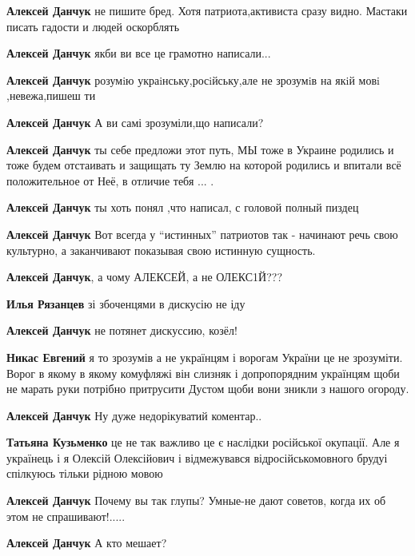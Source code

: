 \begin{itemize}
{\begin{itemize}
\textbf{Алексей Данчук} не пишите бред. Хотя патриота,активиста сразу видно.
Мастаки писать гадости и людей оскорблять

\textbf{Алексей Данчук} якби ви все це грамотно написали...

\textbf{Алексей Данчук} розумiю украiнську,росiйську,але не зрозумiв на якiй мовi ,невежа,пишеш ти

\textbf{Алексей Данчук} А ви самі зрозуміли,що написали?

\textbf{Алексей Данчук} ты себе предложи этот путь, МЫ тоже в Украине родились и тоже будем отстаивать и защищать ту Землю на которой родились и впитали всё положительное от Неё, в отличие тебя ... .

\textbf{Алексей Данчук} ты хоть понял ,что написал, с головой полный пиздец


\textbf{Алексей Данчук} Вот всегда у \enquote{истинных} патриотов так - начинают речь
свою культурно, а заканчивают показывая свою истинную сущность.

\textbf{Алексей Данчук}, а чому АЛЕКСЕЙ, а не ОЛЕКС1Й???

\textbf{Илья Рязанцев} зі збоченцями в дискусію не іду

\textbf{Алексей Данчук} не потянет дискуссию, козёл!


\textbf{Никас Евгений} я то зрозумів а не українцям і ворогам України це не зрозуміти.
Ворог в якому в якому комуфляжі він слизняк і допропорядним українцям щоби не
марать руки потрібно притрусити Дустом щоби вони зникли з нашого огороду.

\textbf{Алексей Данчук} Ну дуже недорікуватий коментар..

\textbf{Татьяна Кузьменко} це не так важливо це є наслідки російської окупації.
Але я українець і я Олексій Олексійович і відмежувався відросійськомовного
брудуі спілкуюсь тільки рідною мовою

\textbf{Алексей Данчук} Почему вы так глупы? Умные-не дают советов, когда их об этом не спрашивают!.....

\textbf{Алексей Данчук} А кто мешает?


\end{itemize}}
\end{itemize}
